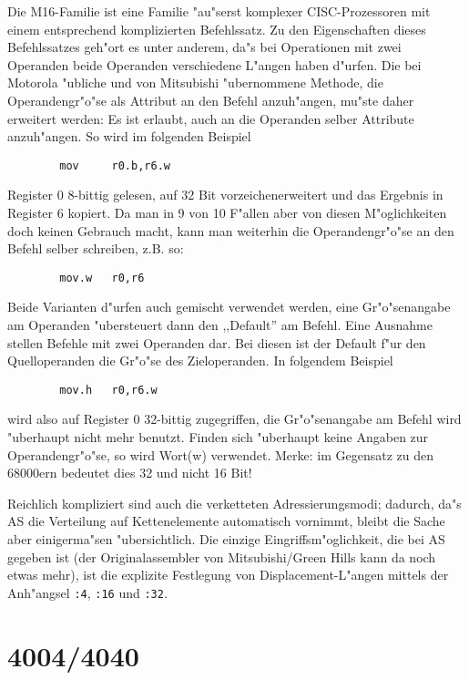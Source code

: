 \documentclass[12pt,a4paper,twoside]{report}
\newcommand{\tty}[1]{{\tt #1}}
\begin{document}
{Die M16-Familie ist eine Familie "au"serst komplexer CISC-Prozessoren
mit einem entsprechend komplizierten Befehlssatz.  Zu den Eigenschaften
dieses Befehlssatzes geh"ort es unter anderem, da"s bei Operationen
mit zwei Operanden beide Operanden verschiedene L"angen haben d"urfen.
Die bei Motorola "ubliche und von Mitsubishi "ubernommene Methode, die
Operandengr"o"se als Attribut an den Befehl anzuh"angen, mu"ste daher
erweitert werden: Es ist erlaubt, auch an die Operanden selber Attribute
anzuh"angen.  So wird im folgenden Beispiel
\begin{verbatim}
        mov     r0.b,r6.w
\end{verbatim}
Register 0 8-bittig gelesen, auf 32 Bit vorzeichenerweitert und das
Ergebnis in Register 6 kopiert.  Da man in 9 von 10 F"allen aber von
diesen M"oglichkeiten doch keinen Gebrauch macht, kann man weiterhin
die Operandengr"o"se an den Befehl selber schreiben, z.B. so:
\begin{verbatim}
        mov.w   r0,r6
\end{verbatim}
Beide Varianten d"urfen auch gemischt verwendet werden, eine
Gr"o"senangabe am Operanden "ubersteuert dann den ,,Default'' am Befehl.
Eine Ausnahme stellen Befehle mit zwei Operanden dar.   Bei diesen ist
der Default f"ur den Quelloperanden die Gr"o"se des Zieloperanden. In
folgendem Beispiel
\begin{verbatim}
        mov.h   r0,r6.w
\end{verbatim}
wird also auf Register 0 32-bittig zugegriffen, die Gr"o"senangabe
am Befehl wird "uberhaupt nicht mehr benutzt.  Finden sich "uberhaupt
keine Angaben zur Operandengr"o"se, so wird Wort(w) verwendet.  Merke:
im Gegensatz zu den 68000ern bedeutet dies 32 und nicht 16 Bit!
\par
Reichlich kompliziert sind auch die verketteten Adressierungsmodi;
dadurch, da"s AS die Verteilung auf Kettenelemente automatisch
vornimmt, bleibt die Sache aber einigerma"sen "ubersichtlich.  Die
einzige Eingriffsm"oglichkeit, die bei AS gegeben ist (der Originalassembler
von Mitsubishi/Green Hills kann da noch etwas mehr), ist die explizite
Festlegung von Displacement-L"angen mittels der Anh"angsel \tty{:4},
\tty{:16} und \tty{:32}.


\section{4004/4040}

}
\end{document}
